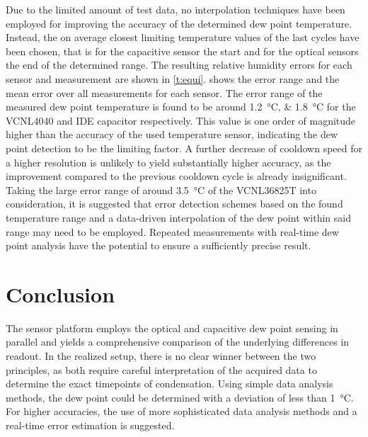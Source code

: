 \documentclass[conference,a4paper]{IEEEtran}
\begin{document}
Due to the limited amount of test data, no interpolation techniques have been employed for improving the accuracy of the determined dew point temperature. Instead, the on average closest limiting temperature values of the last cycles have been chosen, that is for the capacitive sensor the start and for the optical sensors the end of the determined range. The resulting relative humidity errors for each sensor and measurement are shown in \cref{t:equi}.  shows the error range and the mean error over all measurements for each sensor. The error range of the measured dew point temperature is found to be around \qtylist{1.2;1.8}{\celsius} for the VCNL4040 and IDE capacitor respectively. This value is one order of magnitude higher than the accuracy of the used temperature sensor, indicating the dew point detection to be the limiting factor. A further decrease of cooldown speed for a higher resolution is unlikely to yield substantially higher accuracy, as the improvement compared to the previous cooldown cycle is already insignificant. Taking the large error range of around \qty{3.5}{\celsius} of the VCNL36825T into consideration, it is suggested that error detection schemes based on the found temperature range and a data-driven interpolation of the dew point within said range may need to be employed. Repeated measurements with real-time dew point analysis have the potential to ensure a sufficiently precise result.


\section{Conclusion}
The sensor platform employs the optical and capacitive dew point sensing in parallel and yields a comprehensive comparison of the underlying differences in readout. In the realized setup, there is no clear winner between the two principles, as both require careful interpretation of the acquired data to determine the exact timepoints of condensation. Using simple data analysis methods, the dew point could be determined with a deviation of less than \qty{1}{\celsius}. For higher accuracies, the use of more sophisticated data analysis methods and a real-time error estimation is suggested.

\end{document}
